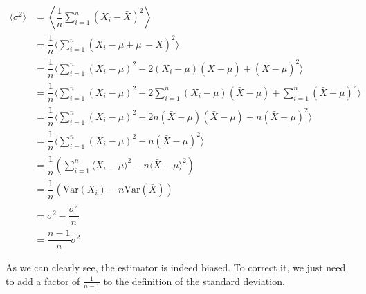 \begin{align*}
    \langle \sigma^2 \rangle    &= \left\langle \dfrac{1}{n} \sum_{i=1}^n (X_i - \bar{X})^2 \right\rangle \\
                                &= \dfrac{1}{n} \langle  \sum_{i=1}^n (X_i - \mu + \mu \, - \bar{X})^2 \rangle \\ 
                                &= \dfrac{1}{n} \langle  \sum_{i=1}^n (X_i - \mu)^2 -2(X_i -\mu)(\bar{X} - \mu) + (\bar{X} - \mu)^2 \rangle \\
                                &= \dfrac{1}{n} \langle  \sum_{i=1}^n ( X_i - \mu)^2 -2 \sum_{i=1}^n (X_i -\mu)(\bar{X} - \mu) + \sum_{i=1}^n(\bar{X} - \mu)^2 \rangle  \\
                                &= \dfrac{1}{n} \langle  \sum_{i=1}^n ( X_i - \mu)^2 -2n(\bar{X} -\mu)(\bar{X} - \mu) + n(\bar{X} - \mu)^2 \rangle  \\
                                &= \dfrac{1}{n} \langle  \sum_{i=1}^n ( X_i - \mu)^2 -n(\bar{X} - \mu)^2 \rangle  \\
                                &= \dfrac{1}{n} \left( \sum_{i=1}^n \langle X_i - \mu \rangle^2 -n\langle\bar{X} -\mu \rangle^2 \right) \\
                                &= \dfrac{1}{n} \left( \text{Var}(X_i) -n \text{Var}(\bar{X})\right)  \\
                                &= \sigma^2 - \dfrac{\sigma^2}{n}   \\
                                &= \dfrac{n-1}{n} \sigma^2                               
\end{align*}

As we can clearly see, the estimator is indeed biased. To correct it, we just need to add a factor of $\frac{1}{n-1}$ to the definition of the standard deviation.

    